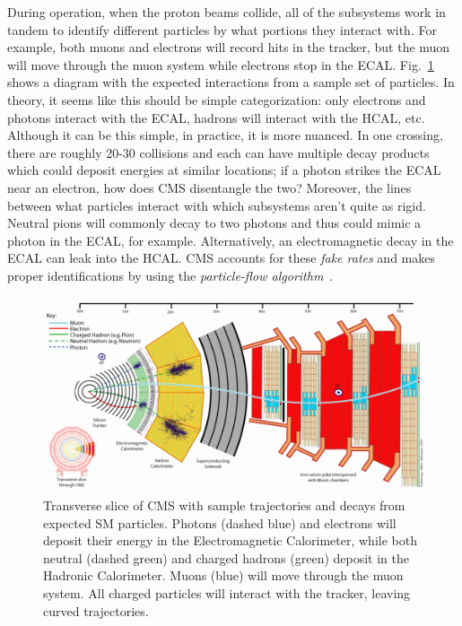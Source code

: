 During operation, when the proton beams collide, all of the subsystems work in tandem to identify different particles by what portions they interact with. For example, both muons and electrons will record hits in the tracker, but the muon will move through the muon system while electrons stop in the ECAL. Fig.~\ref{fig:CMSSliceWithTracks} shows a diagram with the expected interactions from a sample set of particles. In theory, it seems like this should be simple categorization: only electrons and photons interact with the ECAL, hadrons will interact with the HCAL, etc. Although it can be this simple, in practice, it is more nuanced. In one crossing, there are roughly 20-30 collisions and each can have multiple decay products which could deposit energies at similar locations; if a photon strikes the ECAL near an electron, how does CMS disentangle the two? Moreover, the lines between what particles interact with which subsystems aren't quite as rigid. Neutral pions will commonly decay to two photons and thus could mimic a photon in the ECAL, for example. Alternatively, an electromagnetic decay in the ECAL can leak into the HCAL. CMS accounts for these \textit{fake rates} and makes proper identifications by using the \textit{particle-flow algorithm}~\cite{ParticleFlowAlgo}. 

\begin{figure}[htbp]
\begin{center}
\includegraphics[width=.9\linewidth]{Experiment/figures/CMSSliceWithTracks.png}
\caption[Trajectories and Decays for Particle Identification in CMS]{Transverse slice of CMS with sample trajectories and decays from expected SM particles. Photons (dashed blue) and electrons will deposit their energy in the Electromagnetic Calorimeter, while both neutral (dashed green) and charged hadrons (green) deposit in the Hadronic Calorimeter. Muons (blue) will move through the muon system. All charged particles will interact with the tracker, leaving curved trajectories.}
\label{fig:CMSSliceWithTracks}
\end{center}
\end{figure}

